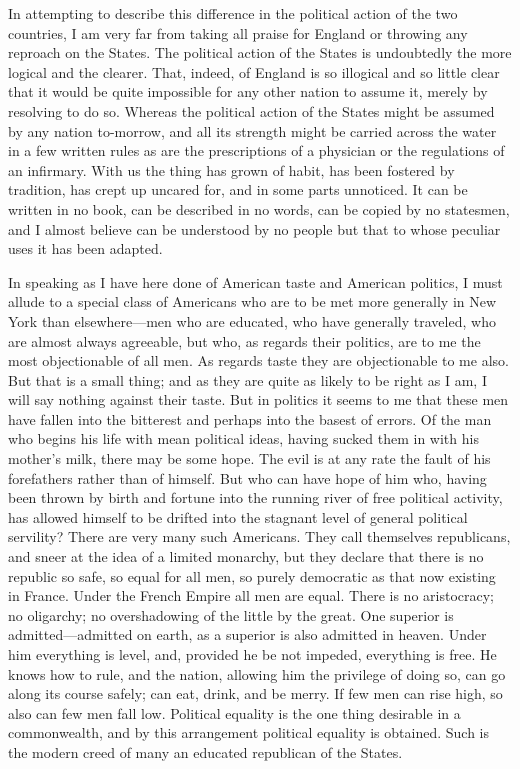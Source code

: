 In attempting to describe this difference in the political action
of the two countries, I am very far from taking all praise for
England or throwing any reproach on the States.  The political
action of the States is undoubtedly the more logical and the
clearer.  That, indeed, of England is so illogical and so little
clear that it would be quite impossible for any other nation to
assume it, merely by resolving to do so.  Whereas the political
action of the States might be assumed by any nation to-morrow, and
all its strength might be carried across the water in a few written
rules as are the prescriptions of a physician or the regulations of
an infirmary.  With us the thing has grown of habit, has been
fostered by tradition, has crept up uncared for, and in some parts
unnoticed.  It can be written in no book, can be described in no
words, can be copied by no statesmen, and I almost believe can be
understood by no people but that to whose peculiar uses it has been
adapted.

In speaking as I have here done of American taste and American
politics, I must allude to a special class of Americans who are to
be met more generally in New York than elsewhere---men who are
educated, who have generally traveled, who are almost always
agreeable, but who, as regards their politics, are to me the most
objectionable of all men.  As regards taste they are objectionable
to me also.  But that is a small thing; and as they are quite as
likely to be right as I am, I will say nothing against their taste.
But in politics it seems to me that these men have fallen into the
bitterest and perhaps into the basest of errors.  Of the man who
begins his life with mean political ideas, having sucked them in
with his mother's milk, there may be some hope.  The evil is at any
rate the fault of his forefathers rather than of himself.  But who
can have hope of him who, having been thrown by birth and fortune
into the running river of free political activity, has allowed
himself to be drifted into the stagnant level of general political
servility?  There are very many such Americans.  They call
themselves republicans, and sneer at the idea of a limited
monarchy, but they declare that there is no republic so safe, so
equal for all men, so purely democratic as that now existing in
France.  Under the French Empire all men are equal.  There is no
aristocracy; no oligarchy; no overshadowing of the little by the
great.  One superior is admitted---admitted on earth, as a superior
is also admitted in heaven.  Under him everything is level, and,
provided he be not impeded, everything is free.  He knows how to
rule, and the nation, allowing him the privilege of doing so, can
go along its course safely; can eat, drink, and be merry.  If few
men can rise high, so also can few men fall low.  Political
equality is the one thing desirable in a commonwealth, and by this
arrangement political equality is obtained.  Such is the modern
creed of many an educated republican of the States.

